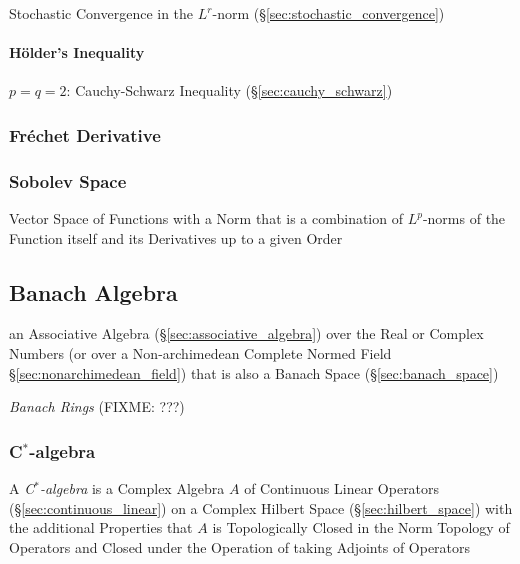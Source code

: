 \fist Stochastic Convergence in the $L^r$-norm
(\S\ref{sec:stochastic_convergence})



\paragraph{H\"older's Inequality}\label{sec:holders_inequality}\hfill

$p = q = 2$: Cauchy-Schwarz Inequality (\S\ref{sec:cauchy_schwarz})



\subsubsection{Fr\'echet Derivative}\label{sec:frechet_derivative}

\subsubsection{Sobolev Space}\label{sec:sobolev_space}

Vector Space of Functions with a Norm that is a combination of $L^p$-norms of
the Function itself and its Derivatives up to a given Order



\subsection{Banach Algebra}\label{sec:banach_algebra}

an Associative Algebra (\S\ref{sec:associative_algebra}) over the Real or
Complex Numbers (or over a Non-archimedean Complete Normed Field
\S\ref{sec:nonarchimedean_field}) that is also a Banach Space
(\S\ref{sec:banach_space})

\emph{Banach Rings} (FIXME: ???)



\subsubsection{C$^*$-algebra}\label{sec:cstar_algebra}

A \emph{C$^*$-algebra} is a Complex Algebra $A$ of Continuous Linear
Operators (\S\ref{sec:continuous_linear}) on a Complex Hilbert Space
(\S\ref{sec:hilbert_space}) with the additional Properties that $A$ is
Topologically Closed in the Norm Topology of Operators and Closed
under the Operation of taking Adjoints of Operators

